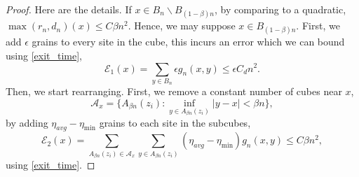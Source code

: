 \documentclass[12pt]{amsart}
\begin{document}
\begin{proof}
 
 Here are the details. If $x \in B_{n} \backslash B_{(1-\beta) n}$, 
 by comparing to a quadratic, $\max(r_n, d_n)(x) \leq C \beta n^2$. Hence, 
 we may suppose $x \in B_{(1-\beta) n}$. First, we add $\epsilon$ grains to every site in the cube, this incurs an error which we can bound using \eqref{exit_time},
  \begin{equation}
 \mathcal{E}_1(x) = \sum_{y \in B_n} \epsilon g_n(x,y) \leq \epsilon C_d n^2.
 \end{equation}
 Then, we start rearranging. First, we remove a constant number of cubes near $x$,
	\begin{equation}
	\mathcal{A}_x = \{ A_{\beta n}(z_i) : \inf_{y \in A_{\beta n}(z_i)} |y - x| < \beta n \}, 
	\end{equation}
	by adding $\eta_{avg}-\eta_{\min}$ grains to each site in the subcubes, 
	\begin{equation}
	\mathcal{E}_2(x) = \sum_{A_{\beta n}(z_i) \in \mathcal{A}_x} \sum_{y \in A_{\beta n}(z_i)}  (\eta_{avg}-\eta_{\min}) g_n(x,y) \leq  C \beta n^2, 
	\end{equation} 
	using \eqref{exit_time}. 


\end{proof}
\end{document}

